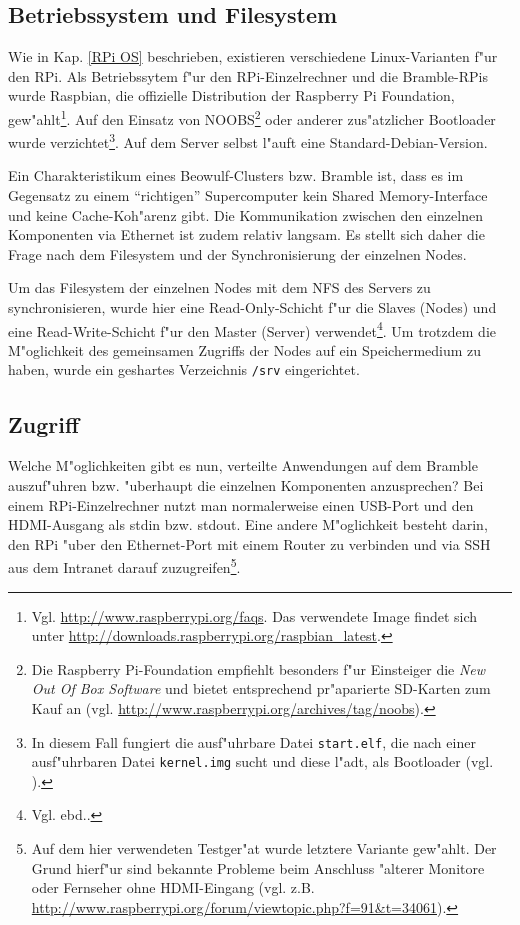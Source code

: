 
\subsection{Betriebssystem und Filesystem}\label{Bramble Systemarchitektur} 

Wie in Kap. \ref{RPi OS} beschrieben, existieren verschiedene Linux-Varianten f"ur den RPi. Als Betriebssytem f"ur den RPi-Einzelrechner und die Bramble-RPis wurde Raspbian, die offizielle Distribution der Raspberry Pi Foundation, gew"ahlt\footnote{Vgl. \url{http://www.raspberrypi.org/faqs}. Das verwendete Image findet sich unter \url{http://downloads.raspberrypi.org/raspbian_latest}.}. Auf den Einsatz von NOOBS\footnote{Die Raspberry Pi-Foundation empfiehlt besonders f"ur Einsteiger die \textit{New Out Of Box Software} und bietet entsprechend pr"aparierte SD-Karten zum Kauf an (vgl. \url{http://www.raspberrypi.org/archives/tag/noobs}).} oder anderer zus"atzlicher Bootloader wurde verzichtet\footnote{In diesem Fall fungiert die ausf"uhrbare Datei \texttt{start.elf}, die nach einer ausf"uhrbaren Datei \texttt{kernel.img} sucht und diese l"adt, als Bootloader (vgl. \cite{kli13}).}. Auf dem Server selbst l"auft eine Standard-Debian-Version. 

Ein Charakteristikum eines Beowulf-Clusters bzw. Bramble ist, dass es im Gegensatz zu einem "`richtigen"' Supercomputer kein Shared Memory-Interface und keine Cache-Koh"arenz gibt. Die Kommunikation zwischen den einzelnen Komponenten via Ethernet ist zudem relativ langsam. Es stellt sich daher die Frage nach dem Filesystem und der Synchronisierung der einzelnen Nodes. 

Um das Filesystem der einzelnen Nodes mit dem NFS des Servers zu synchronisieren, wurde hier eine Read-Only-Schicht f"ur die Slaves (Nodes) und eine Read-Write-Schicht f"ur den Master (Server) verwendet\footnote{Vgl. ebd..}. Um trotzdem die M"oglichkeit des gemeinsamen Zugriffs der Nodes auf ein Speichermedium zu haben, wurde ein geshartes Verzeichnis \texttt{/srv} eingerichtet. 

\subsection{Zugriff}\label{Bramble Zugriff}

Welche M"oglichkeiten gibt es nun, verteilte Anwendungen auf dem Bramble auszuf"uhren bzw. "uberhaupt die einzelnen Komponenten anzusprechen? Bei einem RPi-Einzelrechner nutzt man normalerweise einen USB-Port und den HDMI-Ausgang als stdin bzw. stdout. Eine andere M"oglichkeit besteht darin, den RPi "uber den Ethernet-Port mit einem Router zu verbinden und via SSH aus dem Intranet darauf zuzugreifen\footnote{Auf dem hier verwendeten Testger"at wurde letztere Variante gew"ahlt. Der Grund hierf"ur sind bekannte Probleme beim Anschluss "alterer Monitore oder Fernseher ohne HDMI-Eingang (vgl. z.B. \url{http://www.raspberrypi.org/forum/viewtopic.php?f=91&t=34061}).}. 

